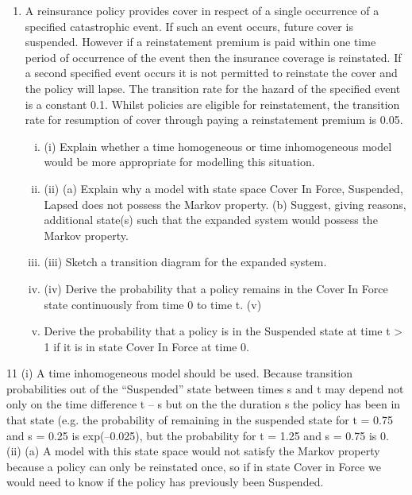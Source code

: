 \documentclass[a4paper,12pt]{article}
\begin{document}
\begin{enumerate}

\item A reinsurance policy provides cover in respect of a single occurrence of a specified catastrophic event. If such an event occurs, future cover is suspended. However if a
reinstatement premium is paid within one time period of occurrence of the event then the insurance coverage is reinstated. If a second specified event occurs it is not
permitted to reinstate the cover and the policy will lapse.
The transition rate for the hazard of the specified event is a constant 0.1. Whilst policies are eligible for reinstatement, the transition rate for resumption of cover through paying a reinstatement premium is 0.05.

\begin{enumerate}[(i)]
\item (i) Explain whether a time homogeneous or time inhomogeneous model would be
more appropriate for modelling this situation.
 
\item (ii) (a)
Explain why a model with state space {Cover In Force, Suspended,
Lapsed} does not possess the Markov property.
(b)
Suggest, giving reasons, additional state(s) such that the expanded
system would possess the Markov property.
 
\item (iii) Sketch a transition diagram for the expanded system.  
\item (iv) Derive the probability that a policy remains in the Cover In Force state
continuously from time 0 to time t.  
(v)
\item Derive the probability that a policy is in the Suspended state at time t > 1 if it
is in state Cover In Force at time 0.
\end{enumerate}
\end{enumerate}
\newpage
11
(i)
A time inhomogeneous model should be used.
Because transition probabilities out of the “Suspended” state between times s and t may depend not only on the time difference t – s but on the
the duration s the policy has been in that state (e.g. the probability of
remaining in the suspended state for t = 0.75 and s = 0.25 is exp(–0.025), but the probability for t = 1.25 and s = 0.75 is 0.
(ii)
(a)
A model with this state space would not satisfy the Markov property because a policy can only be reinstated once,
so if in state Cover in Force we would need to know if the policy has previously been Suspended.
\end{document}
